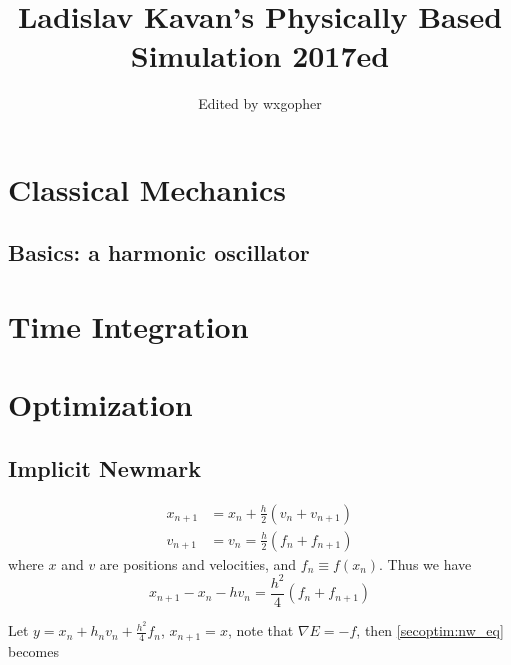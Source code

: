 \documentclass{fancydoc}
\begin{document}
\title{Ladislav Kavan's Physically Based Simulation 2017ed}
\author{Edited by wxgopher}
%
%
%
%

\section{Classical Mechanics}

\subsection{Basics: a harmonic oscillator}

\section{Time Integration}

\section{Optimization}
\subsection{Implicit Newmark}

\begin{subequations}
	\begin{align}
	x_{n+1} &= x_n + \frac{h}{2}(v_n + v_{n+1})\\
	v_{n+1} &= v_n = \frac{h}{2}(f_n + f_{n+1})
	\end{align}
\end{subequations}
where $x$ and $v$ are positions and velocities, and $f_n \equiv f(x_n)$. Thus we have
\begin{equation}\label{secoptim:nw_eq}
x_{n+1} - x_n - hv_n = \frac{h^2}{4}(f_n + f_{n+1})
\end{equation}

Let $y = x_n + h_nv_n + \frac{h^2}{4}f_n$, $x_{n+1} = x$, note that $\nabla E = -f$, then \eqref{secoptim:nw_eq} becomes
\end{document}
